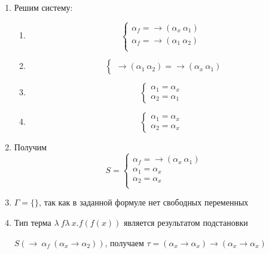 	\begin{enumerate}
		\item Решим систему:\par 
			\begin{enumerate}
			\item \[\begin{cases}
				\alpha_f=\rightarrow(\alpha_x\:\alpha_1)&\\
				\alpha_f=\rightarrow(\alpha_1\:\alpha_2)&\\
			\end{cases}\]
			\item \[
				\begin{cases}
				\rightarrow(\alpha_1\:\alpha_2)=\rightarrow(\alpha_x\:\alpha_1)
				\end{cases}\]
			\item \[
				\begin{cases}
				\alpha_1=\alpha_x&\\
				\alpha_2=\alpha_1
				\end{cases}\]
			\item \[
				\begin{cases}
				\alpha_1=\alpha_x&\\
				\alpha_2=\alpha_x
				\end{cases}\]
\end{enumerate}					
		\item  Получим \[S=\begin{cases}
						\alpha_f=\rightarrow(\alpha_x\:\alpha_1)&\\
						\alpha_1=\alpha_x&\\
						\alpha_2=\alpha_x&\\
				\end{cases}\]
		\item $\Gamma=\{\}$, так как в заданной формуле нет свободных переменных
		\item Тип  терма $\lambda\:f\lambda\:x.f(f(x))$ является результатом подстановки\par $S(\rightarrow\:\alpha_f\:(\alpha_x\rightarrow\alpha_2))$, получаем $\tau=(\alpha_x\rightarrow\alpha_x)\rightarrow(\alpha_x\rightarrow\alpha_x)$
	\end{enumerate}
